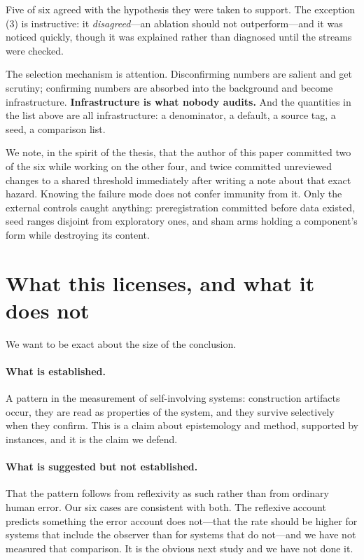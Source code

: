 \documentclass[11pt]{article}
\begin{document}
\noindent
Five of six agreed with the hypothesis they were taken to support. The
exception (3) is instructive: it \emph{disagreed}---an ablation should not
outperform---and it was noticed quickly, though it was explained rather than
diagnosed until the streams were checked.

The selection mechanism is attention. Disconfirming numbers are salient and get
scrutiny; confirming numbers are absorbed into the background and become
infrastructure. \textbf{Infrastructure is what nobody audits.} And the
quantities in the list above are all infrastructure: a denominator, a default,
a source tag, a seed, a comparison list.

We note, in the spirit of the thesis, that the author of this paper committed
two of the six while working on the other four, and twice committed
unreviewed changes to a shared threshold immediately after writing a note
about that exact hazard. Knowing the failure mode does not confer immunity from
it. Only the external controls caught anything: preregistration committed
before data existed, seed ranges disjoint from exploratory ones, and sham arms
holding a component's form while destroying its content.

\section{What this licenses, and what it does not}

We want to be exact about the size of the conclusion.

\paragraph{What is established.} A pattern in the measurement of self-involving
systems: construction artifacts occur, they are read as properties of the
system, and they survive selectively when they confirm. This is a claim about
epistemology and method, supported by instances, and it is the claim we defend.

\paragraph{What is suggested but not established.} That the pattern follows
from reflexivity as such rather than from ordinary human error. Our six cases
are consistent with both. The reflexive account predicts something the error
account does not---that the rate should be higher for systems that include the
observer than for systems that do not---and we have not measured that
comparison. It is the obvious next study and we have not done it.
\end{document}
